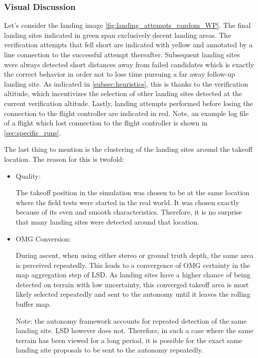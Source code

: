     \subsubsection{Visual Discussion}
    Let's consider the landing image \ref{fig:landing_attempts_random_WP}. The final landing sites indicated in green span exclusively decent landing areas. The verification attempts that fell short are indicated with yellow and annotated by a line connection to the successful attempt thereafter. Subsequent landing sites were always detected short distances away from failed candidates which is exactly the correct behavior in order not to lose time pursuing a far away follow-up landing site. As indicated in \cref{subsec:heuristics}, this is thanks to the verification altitude, which incentivizes the selection of other landing sites detected at the current verification altitude. Lastly, landing attempts performed before losing the connection to the flight controller are indicated in red. Note, an example log file of a flight which lost connection to the flight controller is shown in \cref{sec:specific_runs}.
    
    The last thing to mention is the clustering of the landing sites around the takeoff location. The reason for this is twofold:
    \begin{itemize}
        \item Quality: 
        
        The takeoff position in the simulation was chosen to be at the same location where the field tests were started in the real world. It was chosen exactly because of its even and smooth characteristics. Therefore, it is no surprise that many landing sites were detected around that location. 
        \item OMG Conversion: 
        
        During ascent, when using either stereo or ground truth depth, the same area is perceived repeatedly. This leads to a convergence of OMG certainty in the map aggregation step of LSD. As landing sites have a higher chance of being detected on terrain with low uncertainty, this converged takeoff area is most likely selected repeatedly and sent to the autonomy until it leaves the rolling buffer map. 
        
        Note: the autonomy framework accounts for repeated detection of the same landing site. LSD however does not. Therefore, in such a case where the same terrain has been viewed for a long period, it is possible for the exact same landing site proposals to be sent to the autonomy repeatedly.
    \end{itemize}

